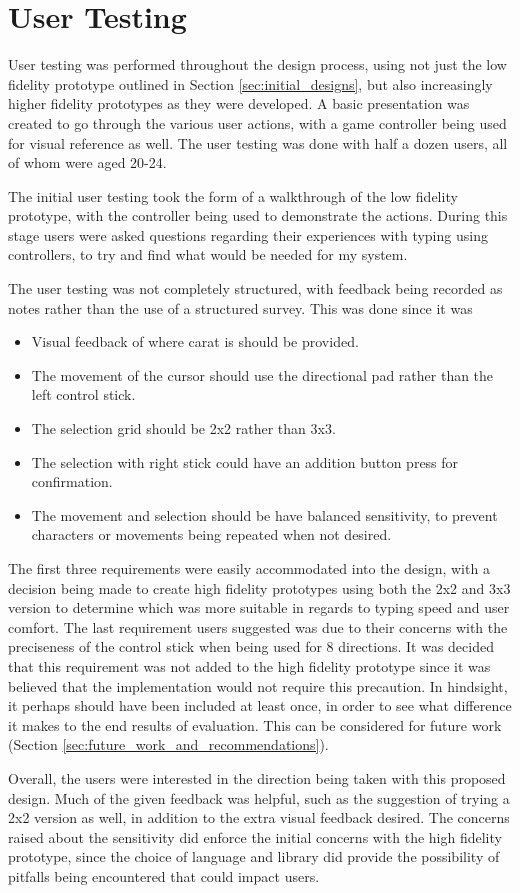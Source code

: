 \documentclass[testing.tex]{subfiles}
\begin{document}
\section{User Testing} %
\label{sec:user_testing}
User testing was performed throughout the design process, using not just the
low fidelity prototype outlined in Section \ref{sec:initial_designs}, but also
increasingly higher fidelity prototypes as they were developed. A basic
presentation was created to go through the various user actions, with a game
controller being used for visual reference as well. The user testing was done
with half a dozen users, all of whom were aged 20-24.

The initial user testing took the form of a walkthrough of the low fidelity
prototype, with the controller being used to demonstrate the actions. During
this stage users were asked questions regarding their experiences with typing
using controllers, to try and find what would be needed for my system. 

The user testing was not completely structured, with feedback being recorded as
notes rather than the use of a structured survey. This was done since it was

\begin{itemize}
	\item Visual feedback of where carat is should be provided.
	\item The movement of the cursor should use the directional pad rather than
	the left control stick.
	\item The selection grid should be 2x2 rather than 3x3.
	\item The selection with right stick could have an addition button press for
	confirmation.
	\item The movement and selection should be have balanced sensitivity, to
	prevent characters or movements being repeated when not desired.
\end{itemize}

The first three requirements were easily accommodated into the design, with a
decision being made to create high fidelity prototypes using both the 2x2 and
3x3 version to determine which was more suitable in regards to typing speed and
user comfort. The last requirement users suggested was due to their concerns
with the preciseness of the control stick when being used for 8 directions. It
was decided that this requirement was not added to the high fidelity prototype
since it was believed that the implementation would not require this precaution.
In hindsight, it perhaps should have been included at least once, in order to 
see what difference it makes to the end results of evaluation. This can be
considered for future work (Section \ref{sec:future_work_and_recommendations}).

Overall, the users were interested in the direction being taken with this
proposed design. Much of the given feedback was helpful, such as the suggestion
of trying a 2x2 version as well, in addition to the extra visual feedback
desired. The concerns raised about the sensitivity did enforce the initial
concerns with the high fidelity prototype, since the choice of language and
library did provide the possibility of pitfalls being encountered that could
impact users.
\end{document}
